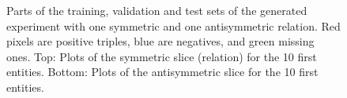 \documentclass{article}
\begin{document}
\begin{figure}
    \caption{Parts of the training, validation and test sets of the generated experiment with one symmetric and one antisymmetric relation. Red pixels are positive triples, blue are negatives, and green missing ones. Top: Plots of the symmetric slice (relation) for the 10 first entities. Bottom: Plots of the antisymmetric slice for the 10 first entities.}
	\label{fig:symmetry_example}
\end{figure}



\end{document}
